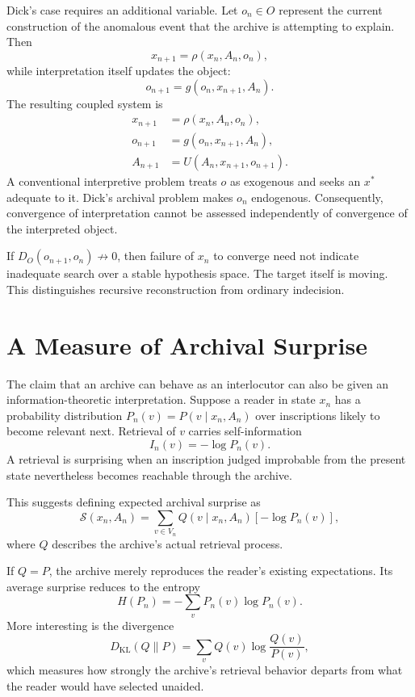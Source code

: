 \documentclass[11pt]{article}
\begin{document}
Dick's case requires an additional variable. Let $o_n \in O$ represent the current construction of the anomalous event that the archive is attempting to explain. Then
\[
x_{n+1} = \rho(x_n, A_n, o_n),
\]
while interpretation itself updates the object:
\[
o_{n+1} = g(o_n, x_{n+1}, A_n).
\]
The resulting coupled system is
\[
\boxed{
\begin{aligned}
x_{n+1} &= \rho(x_n, A_n, o_n), \\
o_{n+1} &= g(o_n, x_{n+1}, A_n), \\
A_{n+1} &= U(A_n, x_{n+1}, o_{n+1}).
\end{aligned}}
\]
A conventional interpretive problem treats $o$ as exogenous and seeks an $x^\ast$ adequate to it. Dick's archival problem makes $o_n$ endogenous. Consequently, convergence of interpretation cannot be assessed independently of convergence of the interpreted object.

If $D_O(o_{n+1}, o_n) \not\longrightarrow 0$, then failure of $x_n$ to converge need not indicate inadequate search over a stable hypothesis space. The target itself is moving. This distinguishes recursive reconstruction from ordinary indecision.

\section{A Measure of Archival Surprise}

The claim that an archive can behave as an interlocutor can also be given an information-theoretic interpretation. Suppose a reader in state $x_n$ has a probability distribution $P_n(v) = P(v \mid x_n, A_n)$ over inscriptions likely to become relevant next. Retrieval of $v$ carries self-information
\[
I_n(v) = -\log P_n(v).
\]
A retrieval is surprising when an inscription judged improbable from the present state nevertheless becomes reachable through the archive.

This suggests defining expected archival surprise as
\[
\mathcal{S}(x_n, A_n) = \sum_{v \in V_n} Q(v \mid x_n, A_n)\left[-\log P_n(v)\right],
\]
where $Q$ describes the archive's actual retrieval process.

If $Q = P$, the archive merely reproduces the reader's existing expectations. Its average surprise reduces to the entropy
\[
H(P_n) = -\sum_v P_n(v) \log P_n(v).
\]
More interesting is the divergence
\[
D_{\mathrm{KL}}(Q \| P) = \sum_v Q(v) \log\frac{Q(v)}{P(v)},
\]
which measures how strongly the archive's retrieval behavior departs from what the reader would have selected unaided.
\end{document}

